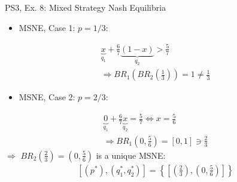 \begin{frame}{PS3, Ex. 8: Mixed Strategy Nash Equilibria}
\begin{multicols}{2}
    \vspace{-8pt}
    \begin{itemize}
      \item MSNE, Case 1: $p=1/3:$
    \end{itemize}
    \vspace{-10pt}
    \begin{align*}
      \underbrace{x}_{q_1} + \frac{6}{7}\underbrace{(1-x)}_{q_2} > \frac{5}{7}\\
      \Rightarrow BR_1\left(BR_2\left(\frac{1}{3}\right)\right)=1\neq\frac{1}{3}
    \end{align*}
    \vspace{-12pt}
    \begin{itemize}
      \item MSNE, Case 2: $p=2/3:$
    \end{itemize}
    \vspace{-10pt}
    \begin{align*}
      \underbrace{0}_{q_1} + \frac{6}{7}\underbrace{x}_{q_2} = \frac{5}{7} \Leftrightarrow x=\frac{5}{6}\\
      \Rightarrow BR_1\left(0,\frac{5}{6}\right)=[0,1]\ni\frac{2}{3}
    \end{align*}
    $\Rightarrow$ $BR_2\left(\frac{2}{3}\right)=\left(0,\frac{5}{6}\right)$ is a unique MSNE:
    \vspace{-4pt}
    \begin{align*}
      \left[\left(p^{*}\right),\left(q_1^{*},q_2^{*}\right)\right]
      =\left\{\left[\left(\frac{2}{3}\right),\left(0,\frac{5}{6}\right)\right]\right\}
    \end{align*}
  \vfill\null
  \end{multicols}
\end{frame}




